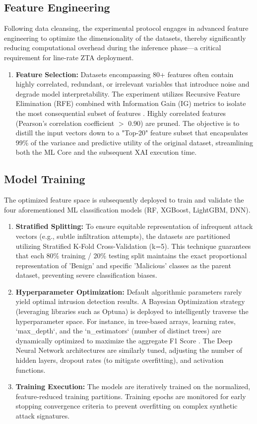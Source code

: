 \documentclass[conference]{IEEEtran}
\begin{document}
\subsection{Feature Engineering}
Following data cleansing, the experimental protocol engages in advanced feature engineering to optimize the dimensionality of the datasets, thereby significantly reducing computational overhead during the inference phase—a critical requirement for line-rate ZTA deployment.

\begin{enumerate}
\item \textbf{Feature Selection:} Datasets encompassing 80+ features often contain highly correlated, redundant, or irrelevant variables that introduce noise and degrade model interpretability. The experiment utilizes Recursive Feature Elimination (RFE) combined with Information Gain (IG) metrics to isolate the most consequential subset of features \cite{ahmad2020network}. Highly correlated features (Pearson’s correlation coefficient $>$ 0.90) are pruned. The objective is to distill the input vectors down to a "Top-20" feature subset that encapsulates 99\% of the variance and predictive utility of the original dataset, streamlining both the ML Core and the subsequent XAI execution time.
\end{enumerate}

\subsection{Model Training}
The optimized feature space is subsequently deployed to train and validate the four aforementioned ML classification models (RF, XGBoost, LightGBM, DNN).

\begin{enumerate}
\item \textbf{Stratified Splitting:} To ensure equitable representation of infrequent attack vectors (e.g., subtle infiltration attempts), the datasets are partitioned utilizing Stratified K-Fold Cross-Validation (k=5). This technique guarantees that each 80\% training / 20\% testing split maintains the exact proportional representation of 'Benign' and specific 'Malicious' classes as the parent dataset, preventing severe classification biases.
\item \textbf{Hyperparameter Optimization:} Default algorithmic parameters rarely yield optimal intrusion detection results. A Bayesian Optimization strategy (leveraging libraries such as Optuna) is deployed to intelligently traverse the hyperparameter space. For instance, in tree-based arrays, learning rates, `max\_depth`, and the `n\_estimators` (number of distinct trees) are dynamically optimized to maximize the aggregate F1 Score \cite{wang2021explainable}. The Deep Neural Network architectures are similarly tuned, adjusting the number of hidden layers, dropout rates (to mitigate overfitting), and activation functions.
\item \textbf{Training Execution:} The models are iteratively trained on the normalized, feature-reduced training partitions. Training epochs are monitored for early stopping convergence criteria to prevent overfitting on complex synthetic attack signatures.
\end{enumerate}
\end{document}
